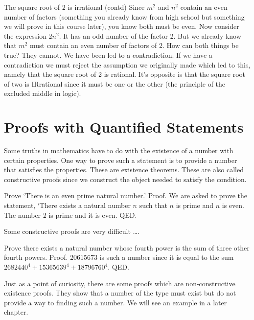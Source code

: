 \documentclass{beamer}
\begin{document}
\begin{frame}{The square root of 2 is irrational (contd)}
Since $m^2$ and $n^2$ contain an even number of factors (something you already know from high school but something we will prove in this course later), you know both must be even. Now consider the expression $2n^2$. It has an odd number of the factor 2. But we already know that $m^2$ must contain an even number of factors of 2. How can both things be true? They cannot. We have been led to a contradiction. If we have a contradiction we must reject the assumption we originally made which led to this, namely that the square root of 2 is rational. It's opposite is that the square root of two is IRrational since it must be one or the other (the principle of the excluded middle in logic). 
\end{frame}

\section{Proofs with Quantified Statements}
\begin{frame}
Some truths in mathematics have to do with the existence of a number with certain properties. One way to prove such a statement is to provide a number that satisfies the properties. These are existence theorems. These are also called constructive proofs since we construct the object needed to satisfy the condition.
\end{frame}

\begin{frame}
Prove `There is an even prime natural number.'
Proof. We are asked to prove the statement, `There exists a natural number $n$ such that $n$ is prime and $n$ is even. The number 2 is prime and it is even. QED.
\end{frame}

\begin{frame}
Some constructive proofs are very difficult \dots .
\end{frame}

\begin{frame}
Prove there exists a  natural number whose fourth power is the sum of three other fourth powers.
Proof. 20615673 is such a number since it is equal to the sum $2682440^4+15365639^4+18796760^4$. QED.
\end{frame}

\begin{frame}
Just as a point of curiosity, there are some proofs which are non-constructive existence proofs. They show that a number of the type must exist but do not provide a way to finding such a number. We will see an example in a later chapter.
\end{frame}
\end{document}
